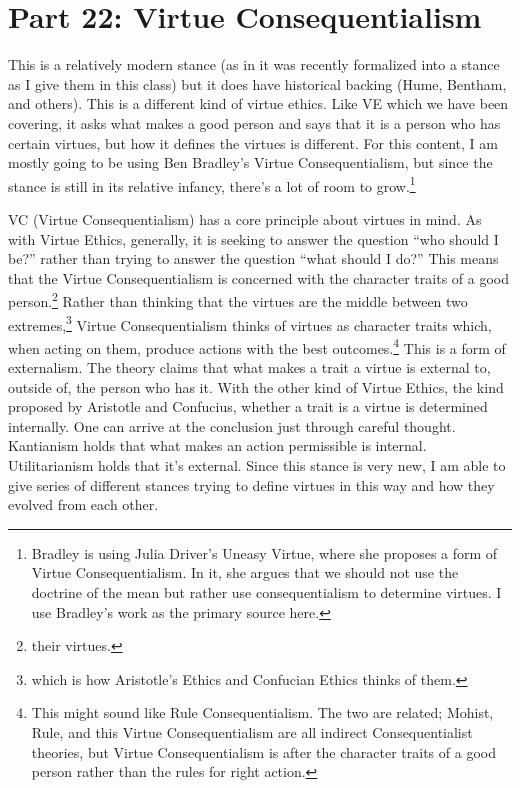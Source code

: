 \chapter{Part 22: Virtue Consequentialism}

This is a relatively modern stance (as in it was recently formalized into a stance as I give them in this class) but it does have historical backing (Hume, Bentham, and others). This is a different kind of virtue ethics. Like VE which we have been covering, it asks what makes a good person and says that it is a person who has certain virtues, but how it defines the virtues is different. For this content, I am mostly going to be using Ben Bradley’s Virtue Consequentialism,\autocite{Bradley1} but since the stance is still in its relative infancy, there’s a lot of room to grow.\footnote{Bradley is using Julia Driver's Uneasy Virtue, where she proposes a form of Virtue Consequentialism. In it, she argues that we should not use the doctrine of the mean but rather use consequentialism to determine virtues. I use Bradley's work as the primary source here.}

VC (\gls{Virtue Consequentialism}) has a core principle about virtues in mind. As with Virtue Ethics, generally, it is seeking to answer the question ``who should I be?'' rather than trying to answer the question ``what should I do?'' This means that the Virtue Consequentialism is concerned with the character traits of a good person.\footnote{their virtues.} Rather than thinking that the virtues are the middle between two extremes,\footnote{which is how Aristotle's Ethics and Confucian Ethics thinks of them.} Virtue Consequentialism thinks of virtues as character traits which, when acting on them, produce actions with the best outcomes.\footnote{This might sound like Rule Consequentialism. The two are related; Mohist, Rule, and this Virtue Consequentialism are all indirect Consequentialist theories, but Virtue Consequentialism is after the character traits of a good person rather than the rules for right action.} This is a form of externalism. The theory claims that what makes a trait a virtue is external to, outside of, the person who has it. With the other kind of Virtue Ethics, the kind proposed by Aristotle and Confucius, whether a trait is a virtue is determined internally. One can arrive at the conclusion just through careful thought. Kantianism holds that what makes an action permissible is internal. Utilitarianism holds that it's external. Since this stance is very new, I am able to give series of different stances trying to define virtues in this way and how they evolved from each other.

